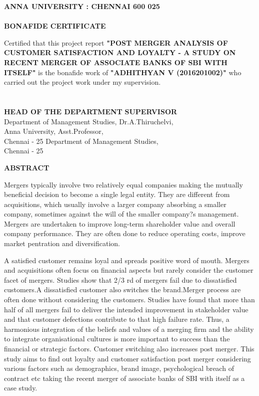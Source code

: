 \documentclass[a4paper, 14pt]{article}
\newcommand\tab[1][1cm]{\hspace*{#1}}
\begin{document}
{%
\newpage
\begin{center}
\textbf{\fontsize{18}{2} \selectfont ANNA UNIVERSITY : CHENNAI 600 025}\\
\tab \\
\textbf{\fontsize{16}{2} \selectfont BONAFIDE CERTIFICATE}\\
\end{center}
Certified that this project report \textbf{"POST MERGER ANALYSIS OF CUSTOMER SATISFACTION AND LOYALTY - A STUDY ON RECENT MERGER OF ASSOCIATE BANKS OF SBI WITH ITSELF"} is the bonafide work of \textbf{"ADHITHYAN V (2016201002)"} who carried out the project work under my supervision.
\tab \\
\tab \\
\tab \\

\noindent \textbf{HEAD OF THE DEPARTMENT} \hfill \hfill \textbf{SUPERVISOR}\\
\noindent Department of Management Studies, \hfill \hfill Dr.A.Thiruchelvi,\\
\noindent Anna University, \hfill \hfill Asst.Professor,\\
\noindent Chennai - 25 \hfill \hfill Department of Management Studies,\\
\noindent \tab \hfill \hfill Chennai - 25\\

\newpage
\begin{center}
\textbf{\fontsize{16}{2} \selectfont ABSTRACT}\\
\end{center}
\par Mergers typically involve two relatively equal companies making the mutually beneficial decision to become a single legal entity. They are different from acquisitions, which usually involve a larger company absorbing a smaller company, sometimes against the will of the smaller company?s management. Mergers are undertaken to improve long-term shareholder value and overall company performance. They are often done to reduce operating costs, improve market pentration and diversification.
\par A satisfied customer remains loyal and spreads positive word of mouth. Mergers and acquisitions often focus on financial aspects but rarely consider the customer facet of mergers. Studies show that 2/3 rd of mergers fail due to dissatisfied customers.A dissatisfied customer also switches the brand.Merger process are often done without considering the customers. Studies have found that more than half of all mergers fail to deliver the intended improvement in stakeholder value and that customer defections contribute to that high failure rate. Thus, a harmonious integration of the beliefs and values of a merging firm and the ability to integrate organisational cultures is more important to success than the financial or strategic factors. Customer switching also increases post merger. This study aims to find out loyalty and customer satisfaction post merger considering various factors such as demographics, brand image, psychological breach of contract etc taking the recent merger of associate banks of SBI with itself as a case study.

}
\end{document}
